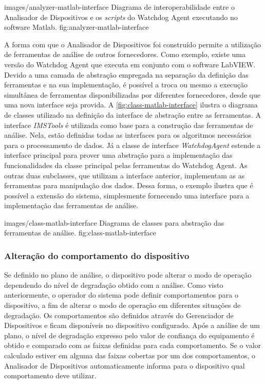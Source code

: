   {images/analyzer-matlab-interface}
  {Diagrama de interoperabilidade entre o Analisador de Dispositivos e os \textit{scripts} do
      Watchdog Agent executando no software Matlab.}
  {fig:analyzer-matlab-interface}

A forma com que o Analisador de Dispositivos foi construído permite a utilização de ferramentas de
análise de outros fornecedores. Como exemplo, existe uma versão do Watchdog Agent que executa em
conjunto com o software LabVIEW. Devido a uma camada de abstração empregada na separação da
definição das ferramentas e na sua implementação, é possível a troca ou mesmo a execução simultânea
de ferramentas disponibilizadas por diferentes fornecedores, desde que uma nova interface seja
provida. A \cref{fig:class-matlab-interface} ilustra o diagrama de classes utilizado na definição da
interface de abstração entre as ferramentas. A interface \emph{IMSTools} é utilizada como base para
a construção das ferramentas de análise. Nela, estão definidas todas as interfaces para os
algoritmos necessários para o processamento de dados. Já a classe de interface \emph{WatchdogAgent}
estende a interface principal para prover uma abstração para a implementação das funcionalidades da
classe principal pelas ferramentas do Watchdog Agent. As outras duas subclasses, que utilizam a
interface anterior, implementam as as ferramentas para manipulação dos dados. Dessa forma, o exemplo
ilustra que é possível a extensão do sistema, simplesmente fornecendo uma interface para a
implementação das ferramentas de análise.

  {images/class-matlab-interface}
  {Diagrama de classes para abstração das ferramentas de análise.}
  {fig:class-matlab-interface}


\subsubsection{Alteração do comportamento do dispositivo}

Se definido no plano de análise, o dispositivo pode alterar o modo de operação dependendo do nível
de degradação obtido com a análise. Como visto anteriormente, o operador do sistema pode definir
comportamentos para o dispositivo, a fim de alterar o modo de operação em diferentes situações de
degradação. Os comportamentos são definidos através do Gerenciador de Dispositivos e ficam
disponíveis no dispositivo configurado. Após a análise de um plano, o nível de degradação expresso
pelo valor de confiança do equipamento é obtido e comparado com as faixas definidas para cada
comportamento. Se o valor calculado estiver em alguma das faixas cobertas por um dos comportamentos,
o Analisador de Dispositivos automaticamente informa para o dispositivo qual comportamento deve
utilizar.



